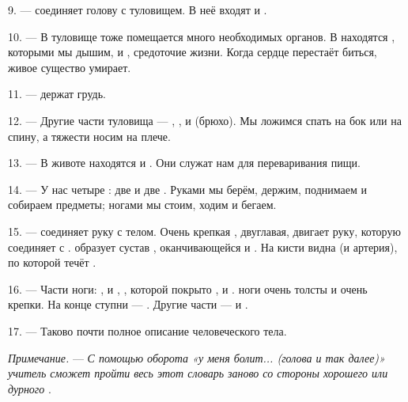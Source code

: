 \VUsaut{4.4mm}
\VUsaut{3.0mm}

9. ---  соединяет голову с туловищем. В неё входят
 и .

10. --- В туловище тоже помещается много необходимых органов. В
 находятся , которыми мы дышим, и
, средоточие жизни. Когда сердце перестаёт биться, живое
существо умирает.

11. ---  держат грудь.

12. --- Другие части туловища --- , ,
 и  (брюхо). Мы ложимся спать на бок или на
спину, а тяжести носим на плече.

13. --- В животе находятся  и . Они служат
нам для переваривания пищи.

\VUsaut{4.4mm}
\VUsaut{3.0mm}

14. --- У нас четыре : две  и две
. Руками мы берём, держим, поднимаем и собираем предметы;
ногами мы стоим, ходим и бегаем.

15. ---  соединяет руку с телом. Очень крепкая ,
двуглавая, двигает руку, которую  соединяет с
.  образует сустав ,
оканчивающейся  и . На кисти видна
 (и артерия), по которой течёт .

16. --- Части ноги: ,  и , ,  которой покрыто ,
 и .  ноги очень толсты и
очень крепки. На конце ступни --- . Другие части ---
 и .

17. --- Таково почти полное описание человеческого тела.

\textit{Примечание.} --- \textit{С помощью оборота «у меня болит...
(голова и так далее)» учитель сможет пройти весь этот словарь заново со
стороны хорошего или дурного} .

\VUsaut{5.0mm}
\VUsaut{2.4mm}
\VUsaut{3.0mm}

